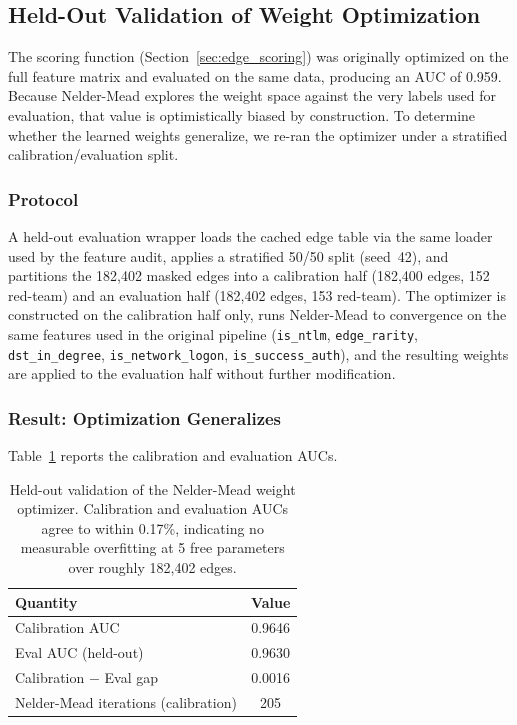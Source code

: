 
\subsection{Held-Out Validation of Weight Optimization}
\label{sec:holdout_weight}

The scoring function (Section~\ref{sec:edge_scoring}) was originally optimized on the full feature matrix and evaluated on the same data, producing an AUC of 0.959. Because Nelder-Mead explores the weight space against the very labels used for evaluation, that value is optimistically biased by construction. To determine whether the learned weights generalize, we re-ran the optimizer under a stratified calibration/evaluation split.

\subsubsection{Protocol}

A held-out evaluation wrapper loads the cached edge table via the same loader used by the feature audit, applies a stratified 50/50 split (seed~42), and partitions the 182,402 masked edges into a calibration half (182,400 edges, 152 red-team) and an evaluation half (182,402 edges, 153 red-team). The optimizer is constructed on the calibration half only, runs Nelder-Mead to convergence on the same features used in the original pipeline (\texttt{is\_ntlm}, \texttt{edge\_rarity}, \texttt{dst\_in\_degree}, \texttt{is\_network\_logon}, \texttt{is\_success\_auth}), and the resulting weights are applied to the evaluation half without further modification.

\subsubsection{Result: Optimization Generalizes}

Table~\ref{tab:holdout_optimizer} reports the calibration and evaluation AUCs.

\begin{table}[h]
\centering
\begin{tabular}{lc}
\hline
Quantity & Value \\
\hline
Calibration AUC & 0.9646 \\
Eval AUC (held-out) & 0.9630 \\
Calibration $-$ Eval gap & 0.0016 \\
Nelder-Mead iterations (calibration) & 205 \\
\hline
\end{tabular}
\caption{Held-out validation of the Nelder-Mead weight optimizer. Calibration and evaluation AUCs agree to within 0.17\%, indicating no measurable overfitting at 5 free parameters over roughly 182,402 edges.}
\label{tab:holdout_optimizer}
\end{table}

